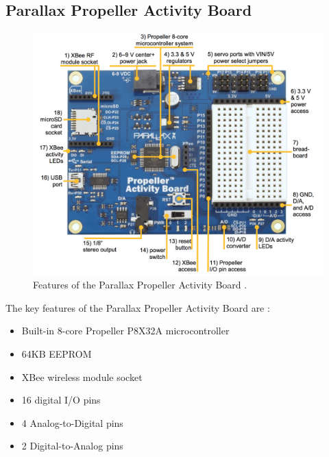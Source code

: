 \documentclass{UoYCSproject}
\begin{document}
\subsection{Parallax Propeller Activity Board}
\begin{figure}[h!]
  \includegraphics[width=\linewidth]{graphics/propeller_board.png}
  \caption{Features of the Parallax Propeller Activity Board \parencite{propellerspec}.}
  \label{fig:prop_board}
\end{figure}

The key features of the Parallax Propeller Activity Board are \parencite{propellerspec}:
\begin{itemize}
\item Built-in 8-core Propeller P8X32A microcontroller
\item 64KB EEPROM
\item XBee wireless module socket
\item 16 digital I/O pins
\item 4 Analog-to-Digital pins
\item 2 Digital-to-Analog pins
\end{itemize}
\end{document}
